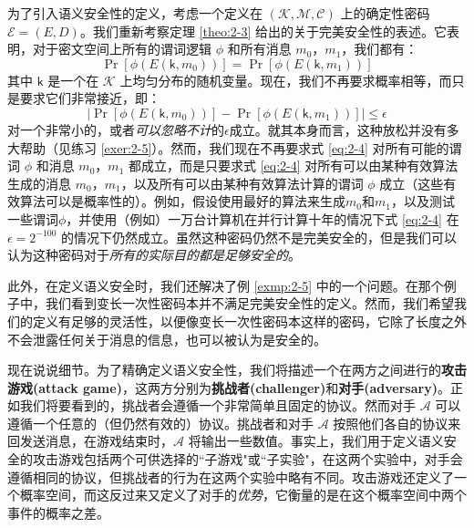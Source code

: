 为了引入语义安全性的定义，考虑一个定义在 $(\mathcal{K},\mathcal{M},\mathcal{C})$ 上的确定性密码 $\mathcal{E}=(E,D)$。我们重新考察定理 \ref{theo:2-3} 给出的关于完美安全性的表述。它表明，对于密文空间上所有的谓词逻辑 $\phi$ 和所有消息 $m_0$，$m_1$，我们都有：
\begin{equation}\label{eq:2-3}
\Pr[\phi(E(\mathsf{k},m_0))]=\Pr[\phi(E(\mathsf{k}, m_1))]
\end{equation}
其中 $\mathsf{k}$ 是一个在 $\mathcal{K}$ 上均匀分布的随机变量。现在，我们不再要求概率相等，而只是要求它们非常接近，即：
\begin{equation}\label{eq:2-4}
|\Pr[\phi(E(\mathsf{k},m_0))]-\Pr[\phi(E(\mathsf{k}, m_1))]|\leq \epsilon
\end{equation}
对一个非常小的，或者\emph{可以忽略不计}的$\epsilon$成立。就其本身而言，这种放松并没有多大帮助（见练习 \ref{exer:2-5}）。然而，我们现在不再要求式 \ref{eq:2-4} 对所有可能的谓词 $\phi$ 和消息 $m_0$，$m_1$ 都成立，而是只要求式 \ref{eq:2-4} 对所有可以由某种有效算法生成的消息 $m_0$，$m_1$，以及所有可以由某种有效算法计算的谓词 $\phi$ 成立（这些有效算法可以是概率性的）。例如，假设使用最好的算法来生成$m_0$和$m_1$，以及测试一些谓词$\phi$，并使用（例如）一万台计算机在并行计算十年的情况下式 \ref{eq:2-4} 在 $\epsilon = 2^{-100}$ 的情况下仍然成立。虽然这种密码仍然不是完美安全的，但是我们可以认为这种密码对于\emph{所有的实际目的都是足够安全的}。

此外，在定义语义安全时，我们还解决了例 \ref{exmp:2-5} 中的一个问题。在那个例子中，我们看到变长一次性密码本并不满足完美安全性的定义。然而，我们希望我们的定义有足够的灵活性，以便像变长一次性密码本这样的密码，它除了长度之外不会泄露任何关于消息的信息，也可以被认为是安全的。

现在说说细节。为了精确定义语义安全性，我们将描述一个在两方之间进行的\textbf{攻击游戏(attack game)}，这两方分别为\textbf{挑战者(challenger)}和\textbf{对手(adversary)}。正如我们将要看到的，挑战者会遵循一个非常简单且固定的协议。然而对手 $\mathcal{A}$ 可以遵循一个任意的（但仍然有效的）协议。挑战者和对手 $\mathcal{A}$ 按照他们各自的协议来回发送消息，在游戏结束时，$\mathcal{A}$ 将输出一些数值。事实上，我们用于定义语义安全的攻击游戏包括两个可供选择的``子游戏"或``子实验"，在这两个实验中，对手会遵循相同的协议，但挑战者的行为在这两个实验中略有不同。攻击游戏还定义了一个概率空间，而这反过来又定义了对手的\emph{优势}，它衡量的是在这个概率空间中两个事件的概率之差。

